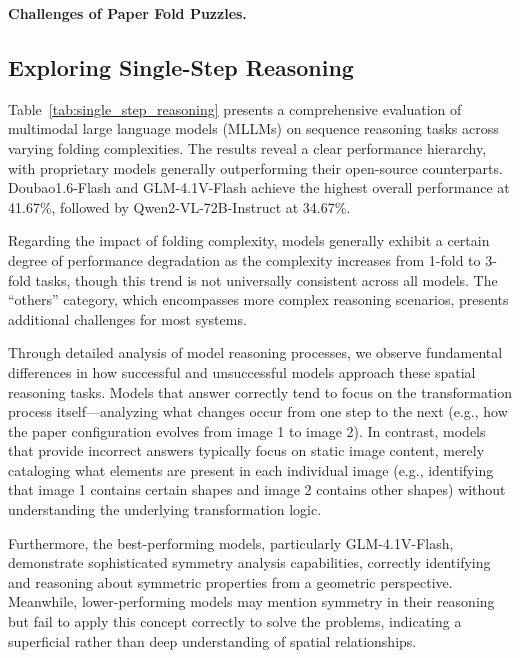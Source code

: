 \documentclass[letterpaper]{article} %
\begin{document}
\noindent \textbf{Challenges of Paper Fold Puzzles.}

\subsection{Exploring Single-Step Reasoning}

Table~\ref{tab:single_step_reasoning} presents a comprehensive evaluation of multimodal large language models (MLLMs) on sequence reasoning tasks across varying folding complexities. The results reveal a clear performance hierarchy, with proprietary models generally outperforming their open-source counterparts. Doubao1.6-Flash and GLM-4.1V-Flash achieve the highest overall performance at 41.67\%, followed by Qwen2-VL-72B-Instruct at 34.67\%.

Regarding the impact of folding complexity, models generally exhibit a certain degree of performance degradation as the complexity increases from 1-fold to 3-fold tasks, though this trend is not universally consistent across all models. The ``others'' category, which encompasses more complex reasoning scenarios, presents additional challenges for most systems.

Through detailed analysis of model reasoning processes, we observe fundamental differences in how successful and unsuccessful models approach these spatial reasoning tasks. Models that answer correctly tend to focus on the transformation process itself—analyzing what changes occur from one step to the next (e.g., how the paper configuration evolves from image 1 to image 2). In contrast, models that provide incorrect answers typically focus on static image content, merely cataloging what elements are present in each individual image (e.g., identifying that image 1 contains certain shapes and image 2 contains other shapes) without understanding the underlying transformation logic.

Furthermore, the best-performing models, particularly GLM-4.1V-Flash, demonstrate sophisticated symmetry analysis capabilities, correctly identifying and reasoning about symmetric properties from a geometric perspective. Meanwhile, lower-performing models may mention symmetry in their reasoning but fail to apply this concept correctly to solve the problems, indicating a superficial rather than deep understanding of spatial relationships.
\end{document}

